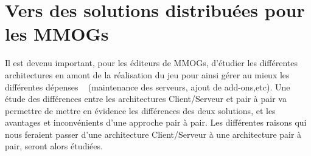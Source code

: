 \section{Vers des solutions distribuées pour les MMOGs}
	\label{whyp2p}
	Il est devenu important, pour les éditeurs de MMOGs, d'étudier les différentes architectures en amont de la réalisation du jeu pour ainsi gérer au mieux les différentes dépenses ~\cite{14101410} (maintenance des serveurs, ajout de add-ons,etc). Une étude des différences entre les architectures Client/Serveur et pair à pair va permettre de mettre en évidence les différences des deux solutions, et les avantages et inconvénients d'une approche pair à pair. Les différentes raisons qui nous feraient passer d'une architecture Client/Serveur à une architecture pair à pair, seront alors étudiées. 

